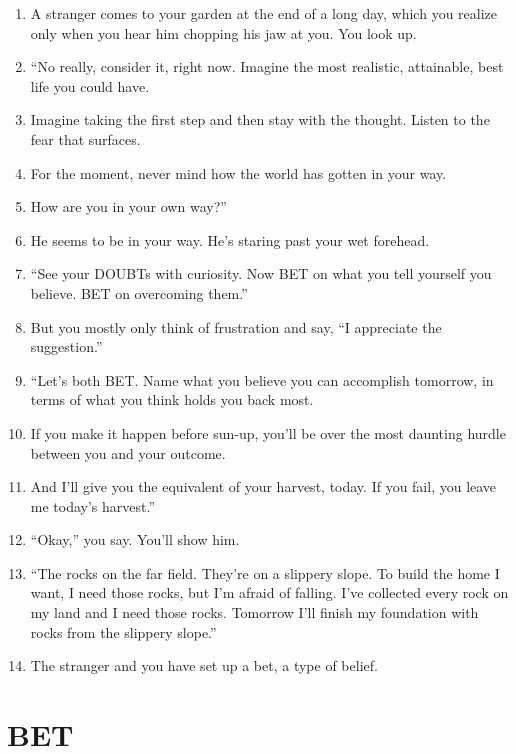 \documentclass[
]{book}
\providecommand{\tightlist}{%
  \setlength{\itemsep}{0pt}\setlength{\parskip}{0pt}}
\begin{document}
\begin{enumerate}
\def\labelenumi{\arabic{enumi}.}
\setcounter{enumi}{9}
\tightlist
\item
  A stranger comes to your garden at the end of a long day, which you realize only when you hear him chopping his jaw at you. You look up.
\item
  ``No really, consider it, right now. Imagine the most realistic, attainable, best life you could have.
\item
  Imagine taking the first step and then stay with the thought. Listen to the fear that surfaces.
\item
  For the moment, never mind how the world has gotten in your way.
\item
  How are you in your own way?''
\item
  He seems to be in your way. He's staring past your wet forehead.
\item
  ``See your DOUBTs with curiosity. Now BET on what you tell yourself
  you believe. BET on overcoming them.''
\item
  But you mostly only think of frustration and say, ``I appreciate the suggestion.''
\item
  ``Let's both BET. Name what you believe you can accomplish tomorrow, in terms of what you think holds you back most.
\item
  If you make it happen before sun-up, you'll be over the most daunting hurdle between you and your outcome.
\item
  And I'll give you the equivalent of your harvest, today. If you fail, you leave me today's harvest.''
\item
  ``Okay,'' you say. You'll show him.
\item
  ``The rocks on the far field. They're on a slippery slope. To build the home I want, I need those rocks, but I'm afraid of falling. I've collected every rock on my land and I need those rocks. Tomorrow I'll finish my foundation with rocks from the slippery slope.''
\item
  The stranger and you have set up a bet, a type of belief.
\end{enumerate}

\hypertarget{bet-1}{%
\section{BET}\label{bet-1}}
\end{document}
